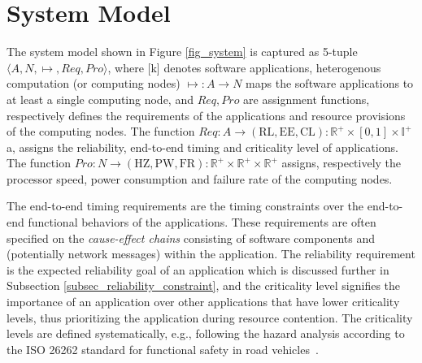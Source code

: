 \section{System Model}\label{sec_system}
The system model shown in Figure \ref{fig_system} is captured as 5-tuple $\langle A,N,\mapsto,Req,Pro\rangle$, where [k] denotes software applications,   heterogenous computation (or computing nodes) $\mapsto: A\rightarrow N$ maps the software applications to at least a single computing node, and $Req, Pro$ are assignment functions, respectively defines the requirements of the applications and resource provisions of the computing nodes. The  function $Req:A\rightarrow (\mathrm{RL,EE,CL}):\mathbb{R}^+\times [0,1]\times \mathbb{I}^+$ a, assigns the reliability, end-to-end timing and criticality level of applications. The function $Pro:N\rightarrow (\mathrm{HZ,PW,FR}):\mathbb{R}^+\times \mathbb{R}^+\times \mathbb{R}^+$ assigns, respectively the processor speed, power consumption and failure rate of the computing nodes. 

The end-to-end timing requirements are the timing constraints over the end-to-end functional behaviors of the applications. These requirements are often specified on the \textit{cause-effect chains} consisting of software components and (potentially network messages) within the application. The reliability requirement is the expected reliability goal of an application which is discussed further in Subsection \ref{subsec_reliability_constraint}, and the criticality level signifies the importance of an application over other applications that have lower criticality levels, thus prioritizing the application during resource contention. The criticality levels are defined systematically, e.g., following the hazard analysis according to the ISO 26262 standard for functional safety in road vehicles~\cite{iso201126262}. 

